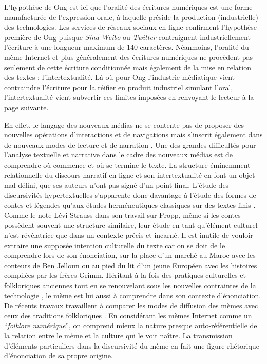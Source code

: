L{\textquoteright}hypothèse de Ong est ici que l{\textquoteright}oralité des écritures numériques est une forme manufacturée de l{\textquoteright}expression orale, à laquelle préside la production (industrielle) des technologies. Les services de réseaux sociaux en ligne confirment l{\textquoteright}hypothèse première de Ong puisque \textit{Sina Weibo }ou \textit{Twitter} contraignent industriellement l{\textquoteright}écriture à une longueur maximum de 140 caractères. Néanmoins, l{\textquoteright}oralité du mème Internet et plus généralement des écritures numériques ne procèdent pas seulement de cette écriture conditionnée mais également de la mise en relation des textes : l{\textquoteright}intertextualité. Là o\`u pour Ong l{\textquoteright}industrie médiatique vient contraindre l{\textquoteright}écriture pour la réifier en produit industriel simulant l{\textquoteright}oral, l{\textquoteright}intertextualité vient subvertir ces limites imposées en renvoyant le lecteur à la page suivante.  

En effet, le langage des nouveaux médias ne se contente pas de proposer des nouvelles opérations d{\textquoteright}interactions et de navigations mais s{\textquoteright}inscrit également dans de nouveaux modes de lecture et de narration \citep{Manovich2001}. Une des grandes difficultés pour l{\textquoteright}analyse textuelle et narrative dans le cadre des nouveaux médias est de comprendre o\`u commence et o\`u se termine le texte. La structure éminemment relationnelle du discours narratif en ligne et son intertextualité en font un objet mal défini, que ses auteurs n{\textquoteright}ont pas signé d{\textquoteright}un point final. L{\textquoteright}étude des discursivités hypertextuelles s{\textquoteright}apparente donc davantage à l{\textquoteright}étude des formes de contes et légendes qu{\textquoteright}aux études herméneutiques classiques sur des textes finis \citep{Clement1995}. Comme le note Lévi-Strauss dans son travail sur Propp, même si les contes possèdent souvent une structure similaire, leur étude en tant qu{\textquoteright}élément culturel n{\textquoteright}est révélatrice que dans un contexte précis et incarné. Il est inutile de vouloir extraire une supposée intention culturelle du texte car on se doit de le comprendre lors de son énonciation, sur la place d{\textquoteright}un marché au Maroc avec les conteurs de Ben Jelloun ou au pied du lit d{\textquoteright}un jeune Européen avec les histoires compilées par les frères Grimm. Héritant à la fois des pratiques culturelles et folkloriques anciennes tout en se renouvelant sous les nouvelles contraintes de la technologie \citep{Barber2008}, le mème est lui aussi à comprendre dans son contexte d{\textquoteright}énonciation. De récents travaux travaillent à comparer les modes de diffusion des mèmes avec ceux des traditions folkloriques \citep{Seta2014}. En considérant les mèmes Internet comme un {\textquotedblleft}\textit{folklore numérique}{\textquotedblright}, on comprend mieux la nature presque auto-référentielle de la relation entre le mème et la culture qui le voit na\^itre. La transmission d{\textquoteright}éléments particuliers dans la discursivité du mème en fait une figure rhétorique d{\textquoteright}énonciation de sa propre origine. 

